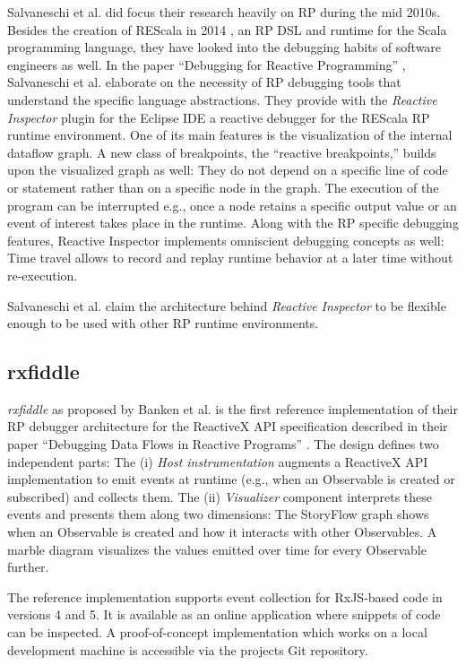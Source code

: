 \documentclass[12pt,a4paper]{article}
\begin{document}
Salvaneschi et al. did focus their research heavily on RP during the mid 2010s. Besides the creation of REScala in 2014 \cite{10.1145/2577080.2577083}, an RP DSL and runtime for the Scala programming language, they have looked into the debugging habits of software engineers as well. In the paper ``Debugging for Reactive Programming'' \cite{10.1145/2884781.2884815}, Salvaneschi et al. elaborate on the necessity of RP debugging tools that understand the specific language abstractions. They provide with the \emph{Reactive Inspector} plugin for the Eclipse IDE a reactive debugger for the REScala RP runtime environment. One of its main features is the visualization of the internal dataflow graph. A new class of  breakpoints, the ``reactive breakpoints,'' builds upon the visualized graph as well: They do not depend on a specific line of code or statement rather than on a specific node in the graph. The execution of the program can be interrupted e.g., once a node retains a specific output value or an event of interest takes place in the runtime. Along with the RP specific debugging features, Reactive Inspector implements omniscient debugging concepts as well: Time travel allows to record and replay runtime behavior at a later time without re-execution.

Salvaneschi et al. claim\cite{10.1145/2577080.2577083} the architecture behind \emph{Reactive Inspector} to be flexible enough to be used with other RP runtime environments.

\subsection{rxfiddle}

\emph{rxfiddle} as proposed by Banken et al. is the first reference implementation of their RP debugger architecture for the ReactiveX API specification described in their paper ``Debugging Data Flows in Reactive Programs'' \cite{10.1145/3180155.3180156}. The design defines two independent parts: The (i) \emph{Host instrumentation} augments a ReactiveX API implementation to emit events at runtime (e.g., when an Observable is created or subscribed) and collects them. The (ii) \emph{Visualizer} component interprets these events and presents them along two dimensions: The StoryFlow graph \cite{YWu2013a} shows when an Observable is created and how it interacts with other Observables. A marble diagram visualizes the values emitted over time for every Observable further.

The reference implementation supports event collection for RxJS-based code in versions 4 and 5. It is available as an online application where snippets of code can be inspected. A proof-of-concept implementation which works on a local development machine is accessible via the projects Git repository.
\end{document}
